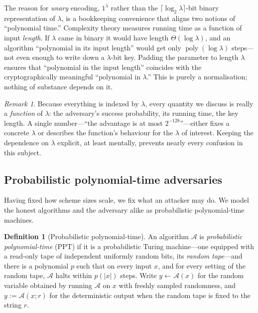 \documentclass[11pt,a4paper]{article}
\theoremstyle{definition}
\newtheorem{definition}[theorem]{Definition}
\theoremstyle{remark}
\newtheorem{remark}[theorem]{Remark}
\DeclareMathOperator{\poly}{poly}
\begin{document}
The reason for \emph{unary} encoding, \(1^\lambda\) rather than the
\(\lceil \log_2 \lambda\rceil\)-bit binary representation of \(\lambda\), is a
bookkeeping convenience that aligns two notions of ``polynomial time.''
Complexity theory measures running time as a function of input \emph{length}. If
\(\lambda\) came in binary it would have length \(\Theta(\log \lambda)\),
and an algorithm ``polynomial in its input length'' would get only
\(\poly(\log \lambda)\) steps---not even enough to write down a \(\lambda\)-bit
key. Padding the parameter to length \(\lambda\) ensures that ``polynomial in
the input length'' coincides with the cryptographically meaningful ``polynomial
in \(\lambda\).'' This is purely a normalisation; nothing of substance depends on
it.

\begin{remark}\label{model:rem:everything-asymptotic}
Because everything is indexed by \(\lambda\), every quantity we discuss is really
a \emph{function} of \(\lambda\): the adversary's success probability, its running
time, the key length. A single number---``the advantage is at most
\(2^{-128}\)''---either fixes a concrete \(\lambda\) or describes the
function's behaviour for the \(\lambda\) of interest. Keeping the dependence on
\(\lambda\) explicit, at least mentally, prevents nearly every confusion in this
subject.
\end{remark}

\subsection{Probabilistic polynomial-time adversaries}\label{model:subsec:ppt}

Having fixed how scheme sizes scale, we fix what an attacker may do. We model the
honest algorithms and the adversary alike as probabilistic
polynomial-time machines.

\begin{definition}[Probabilistic polynomial-time]\label{model:def:ppt}
An algorithm \(\mathcal{A}\) is \emph{probabilistic polynomial-time} (PPT) if it
is a probabilistic Turing machine---one equipped with a read-only tape of
independent uniformly random bits, its \emph{random tape}---and there is a
polynomial \(p\) such that on every input \(x\), and for every setting of the
random tape, \(\mathcal{A}\) halts within \(p(|x|)\) steps. Write
\(y \leftarrow \mathcal{A}(x)\) for the random variable obtained by running
\(\mathcal{A}\) on \(x\) with freshly sampled randomness, and
\(y := \mathcal{A}(x; r)\) for the deterministic output when the random tape is
fixed to the string \(r\).
\end{definition}
\end{document}
